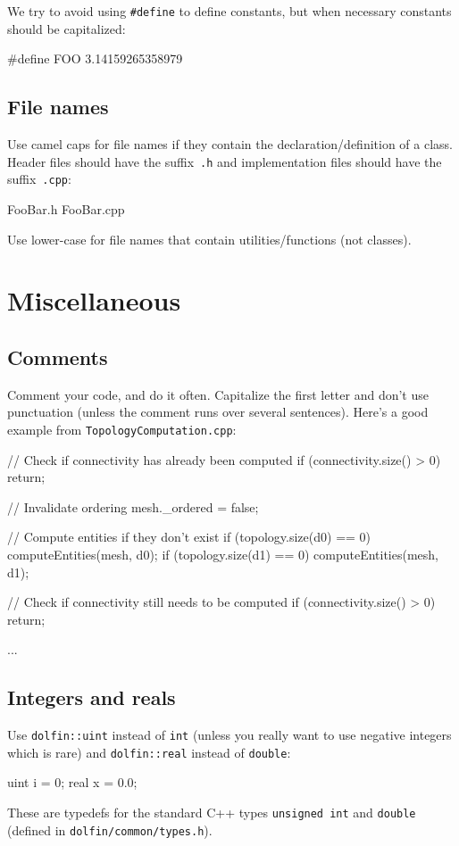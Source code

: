 We try to avoid using \texttt{\#define} to define constants, but when
necessary constants should be capitalized:
\begin{code}
#define FOO 3.14159265358979
\end{code}

\subsection{File names}

Use camel caps for file names if they contain the
declaration/definition of a class. Header files should have the
suffix~\texttt{.h} and implementation files should have the
suffix~\texttt{.cpp}:
\begin{code}
FooBar.h
FooBar.cpp
\end{code}

Use lower-case for file names that contain utilities/functions (not
classes).

\section{Miscellaneous}

\subsection{Comments}

Comment your code, and do it often. Capitalize the first letter and
don't use punctuation (unless the comment runs over several
sentences). Here's a good example from \texttt{TopologyComputation.cpp}:
\begin{code}
// Check if connectivity has already been computed
if (connectivity.size() > 0)
  return;

// Invalidate ordering
mesh._ordered = false;

// Compute entities if they don't exist
if (topology.size(d0) == 0)
  computeEntities(mesh, d0);
if (topology.size(d1) == 0)
  computeEntities(mesh, d1);

// Check if connectivity still needs to be computed
if (connectivity.size() > 0)
  return;

...
\end{code}

\subsection{Integers and reals}

Use \texttt{dolfin::uint} instead of \texttt{int} (unless you really
want to use negative integers which is rare) and \texttt{dolfin::real}
instead of \texttt{double}:
\begin{code}
uint i = 0;
real x = 0.0;
\end{code}
These are typedefs for the standard C++ types \texttt{unsigned int}
and \texttt{double} (defined in \texttt{dolfin/common/types.h}).

